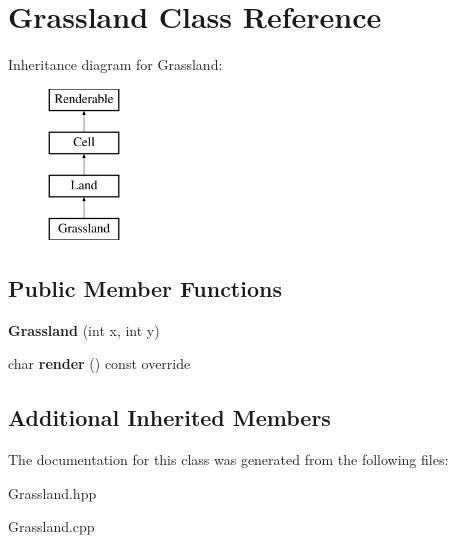 \hypertarget{class_grassland}{}\section{Grassland Class Reference}
\label{class_grassland}
Inheritance diagram for Grassland\+:\begin{figure}[H]
\begin{center}
\leavevmode
\includegraphics[height=4.000000cm]{class_grassland}
\end{center}
\end{figure}
\subsection*{Public Member Functions}
\begin{DoxyCompactItemize}
\item 
\mbox{\label{class_grassland_ab593728bd965fc72533cc1130fe5c54c}} 
{\bfseries Grassland} (int x, int y)
\item 
\mbox{\label{class_grassland_a948f6818d400ac7a378d3ee16ed6527a}} 
char {\bfseries render} () const override
\end{DoxyCompactItemize}
\subsection*{Additional Inherited Members}


The documentation for this class was generated from the following files\+:\begin{DoxyCompactItemize}
\item 
Grassland.\+hpp\item 
Grassland.\+cpp\end{DoxyCompactItemize}
